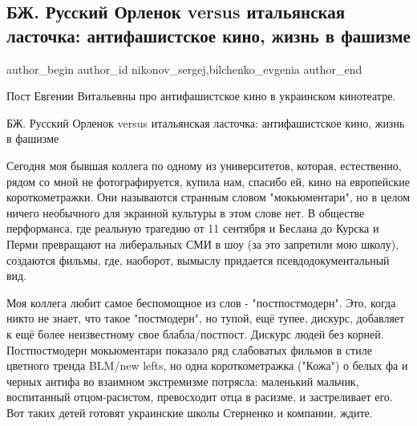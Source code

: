  
 
 
 
 
 
\subsection{БЖ. Русский Орленок versus итальянская ласточка: антифашистское кино, жизнь в фашизме}
\label{sec:21_09_2021.fb.nikonov_sergej.10.bilchenko_orlenok_antifashist_kino}
 
\ifcmt
 author_begin
   author_id nikonov_sergej,bilchenko_evgenia
 author_end
\fi

Пост Евгении Витальевны про антифашистское кино в украинском кинотеатре.

БЖ. Русский Орленок versus итальянская ласточка: антифашистское кино, жизнь в
фашизме

Сегодня моя бывшая коллега по одному из университетов, которая, естественно,
рядом со мной не фотографируется, купила нам, спасибо ей, кино на европейские
короткометражки. Они называются странным словом "мокьюментари", но в целом
ничего необычного для экранной культуры в этом слове нет. В обществе
перформанса, где реальную трагедию от 11 сентября и Беслана до Курска и Перми
превращают на либеральных СМИ в шоу (за это запретили мою школу), создаются
фильмы, где, наоборот, вымыслу придается псевдодокументальный вид.

Моя коллега любит самое беспомощное из слов - "постпостмодерн". Это, когда
никто не знает, что такое "постмодерн", но тупой, ещё тупее, дискурс, добавляет
к ещё более неизвестному свое блабла/постпост. Дискурс людей без корней.
Постпостмодерн мокьюментари показало ряд слабоватых фильмов в стиле цветного
тренда BLM/new lefts, но одна короткометражка ("Кожа") о белых фа и черных
антифа во взаимном экстремизме потрясла: маленький мальчик, воспитанный
отцом-расистом, превосходит отца в расизме, и застреливает его. Вот таких детей
готовят украинские школы Стерненко и компании, ждите.

